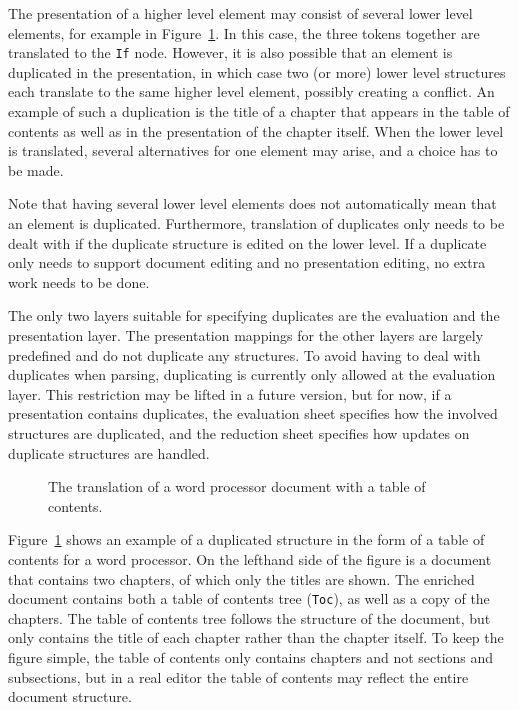 

The presentation of a higher level element may consist of several lower level elements, for example in Figure~\ref{translateExample}. In this case, the three tokens together are translated to the \verb|If| node. However, it is also possible that an element is duplicated in the presentation, in which case two (or more) lower level structures each translate to the same higher level element, possibly creating a conflict. An example of such a duplication is the title of a chapter that appears in the table of contents as well as in the presentation of the chapter itself. When the lower level is translated, several alternatives for one element may arise, and a choice has to be made.

Note that having several lower level elements does not automatically mean that an element is duplicated. Furthermore, translation of duplicates only needs to be dealt with if the duplicate structure is edited on the lower level. If a duplicate only needs to support document editing and no presentation editing, no extra work needs to be done.

The only two layers suitable for specifying duplicates are the evaluation and the presentation layer. The presentation mappings for the other layers are largely predefined and do not duplicate any structures. To avoid having to deal with duplicates when parsing, duplicating is currently only allowed at the evaluation layer. This restriction may be lifted in a future version, but for now, if a presentation contains duplicates, the evaluation sheet specifies how the involved structures are duplicated, and the reduction sheet specifies how updates on duplicate structures are handled.

\begin{figure}
\begin{center}
\begin{center}
%
%
\end{center}
\caption{The translation of a word processor document with a table of contents.}\label{translateExample} 
\end{center}
\end{figure}

Figure~\ref{translateExample} shows an example of a duplicated structure in the form of a table of contents for a word processor. On the lefthand side of the figure is a document that contains two chapters, of which only the titles are shown. The enriched document contains both a table of contents tree (\verb|Toc|), as well as a copy of the chapters. The table of contents tree follows the structure of the document, but only contains the title of each chapter rather than the chapter itself. To keep the figure simple, the table of contents only contains chapters and not sections and subsections, but in a real editor the table of contents may reflect the entire document structure. 

